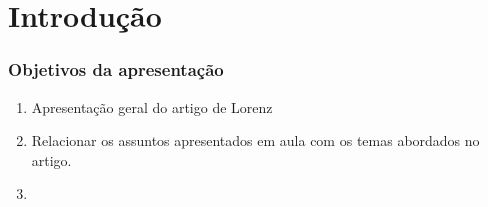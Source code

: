 \section{Introdução} %


\begin{frame}
	\frametitle{Objetivos da apresentação}
    \begin{enumerate}
        \item Apresentação geral do artigo de Lorenz
        \item Relacionar os assuntos apresentados em aula com os temas abordados no artigo. 
        \item 
    \end{enumerate}

\end{frame}

